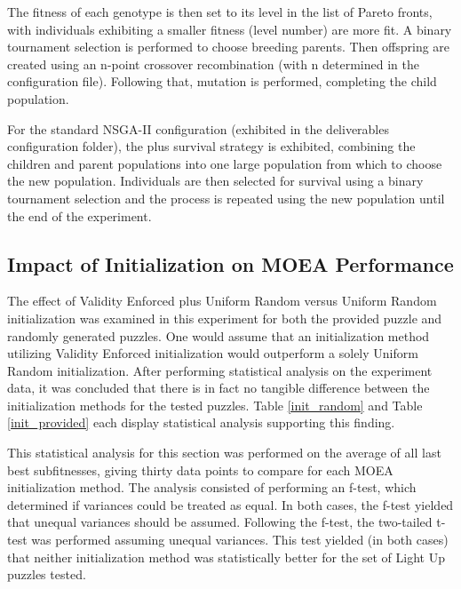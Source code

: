 \documentclass[11pt]{article}
\begin{document}
The fitness of each genotype is then set to its level in the list of Pareto fronts, with
individuals exhibiting a smaller fitness (level number) are more fit. A binary tournament selection 
is performed to choose breeding parents. Then offspring are created using an n-point crossover
recombination (with n determined in the configuration file). Following that, mutation is performed,
completing the child population.

For the standard NSGA-II configuration (exhibited in the deliverables configuration folder),
the plus survival strategy is exhibited, combining the children and parent populations into 
one large population from which to choose the new population. Individuals are then selected for 
survival using a binary tournament selection and the process is repeated using the new population
until the end of the experiment.


\subsection{Impact of Initialization on MOEA Performance}

The effect of Validity Enforced plus Uniform Random versus Uniform Random initialization
was examined in this experiment for both the provided puzzle and randomly generated puzzles.
One would assume that an initialization method utilizing Validity
Enforced initialization would outperform a solely Uniform Random initialization. After performing 
statistical analysis on the experiment data, it was concluded that there is in fact no tangible difference
between the initialization methods for the tested puzzles. Table \ref{init_random} and Table \ref{init_provided} 
each display statistical analysis supporting this finding. 

This statistical analysis for this section was performed on the average of all last best subfitnesses, giving thirty
data points to compare for each MOEA initialization method. The analysis consisted of 
performing an f-test, which determined if variances could be
treated as equal. In both cases, the f-test yielded that unequal variances should be assumed. Following
 the f-test, the two-tailed t-test was performed assuming unequal variances. This test yielded
(in both cases) that neither initialization method was statistically better for the set of Light Up
puzzles tested.
\end{document}
